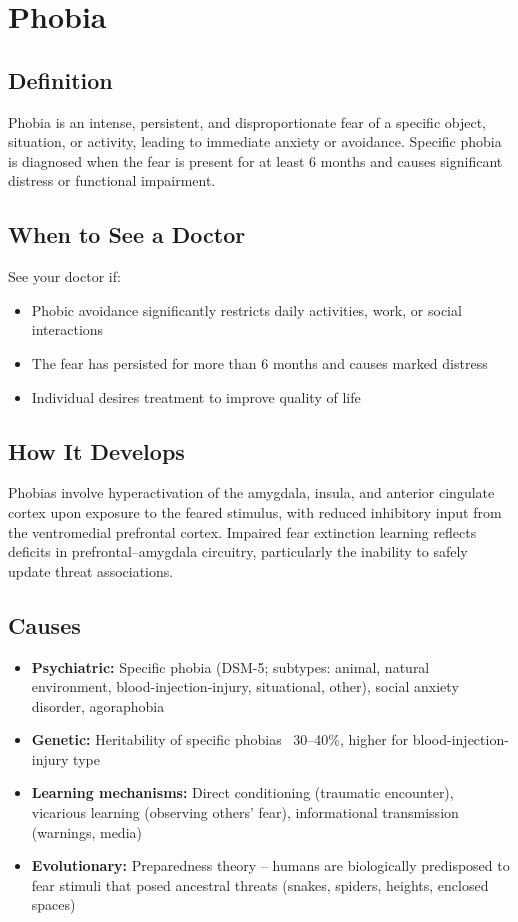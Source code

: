 \chapter{Phobia}

\section*{Definition}
Phobia is an intense, persistent, and disproportionate fear of a specific object, situation, or activity, leading to immediate anxiety or avoidance. Specific phobia is diagnosed when the fear is present for at least 6 months and causes significant distress or functional impairment.

\section*{When to See a Doctor}
See your doctor if:
\begin{itemize}
  \item Phobic avoidance significantly restricts daily activities, work, or social interactions
  \item The fear has persisted for more than 6 months and causes marked distress
  \item Individual desires treatment to improve quality of life
\end{itemize}

\section*{How It Develops}
Phobias involve hyperactivation of the amygdala, insula, and anterior cingulate cortex upon exposure to the feared stimulus, with reduced inhibitory input from the ventromedial prefrontal cortex. Impaired fear extinction learning reflects deficits in prefrontal--amygdala circuitry, particularly the inability to safely update threat associations.

\section*{Causes}
\begin{itemize}
  \item \textbf{Psychiatric:} Specific phobia (DSM-5; subtypes: animal, natural environment, blood-injection-injury, situational, other), social anxiety disorder, agoraphobia
  \item \textbf{Genetic:} Heritability of specific phobias ~30--40\%, higher for blood-injection-injury type
  \item \textbf{Learning mechanisms:} Direct conditioning (traumatic encounter), vicarious learning (observing others' fear), informational transmission (warnings, media)
  \item \textbf{Evolutionary:} Preparedness theory -- humans are biologically predisposed to fear stimuli that posed ancestral threats (snakes, spiders, heights, enclosed spaces)
\end{itemize}

